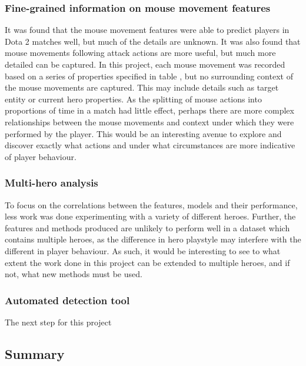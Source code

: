 \documentclass[Report.tex]{subfiles}
\begin{document}
\subsubsection{Fine-grained information on mouse movement features}
It was found that the mouse movement features were able to predict players in Dota 2 matches well, but much of the details are unknown. It was also found that mouse movements following attack actions are more useful, but much more detailed can be captured. In this project, each mouse movement was recorded based on a series of properties specified in table \label{tbl:mm-features}, but no surrounding context of the mouse movements are captured. This may include details such as target entity or current hero properties. As the splitting of mouse actions into proportions of time in a match had little effect, perhaps there are more complex relationships between the mouse movements and context under which they were performed by the player. This would be an interesting avenue to explore and discover exactly what actions and under what circumstances are more indicative of player behaviour. 

\subsubsection{Multi-hero analysis}
To focus on the correlations between the features, models and their performance, less work was done experimenting with a variety of different heroes. Further, the features and methods produced are unlikely to perform well in a dataset which contains multiple heroes, as the difference in hero playstyle may interfere with the different in player behaviour. As such, it would be interesting to see to what extent the work done in this project can be extended to multiple heroes, and if not, what new methods must be used. 

\subsubsection{Automated detection tool}
The next step for this project



\subsection{Summary}
\end{document}
